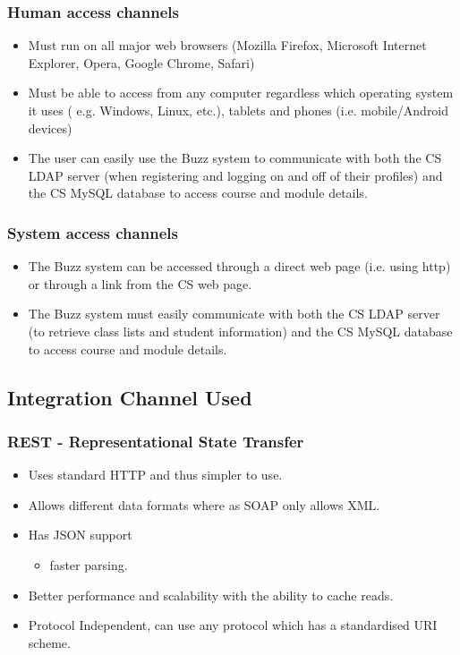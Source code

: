 \documentclass[12pt, oneside]{article}
\begin{document}
	\subsubsection{Human access channels}
		\begin{itemize}
			\item Must run on all major web browsers (Mozilla Firefox, Microsoft Internet Explorer, Opera, Google Chrome, Safari)
			\item Must be able to access from any computer regardless which operating system it uses ( e.g. Windows, Linux, etc.), tablets and phones (i.e. mobile/Android devices)
			\item The user can easily use the Buzz system to communicate with both the CS LDAP server (when registering and logging on and off of their profiles) and the CS MySQL database to access course and module details.
		\end{itemize}
		\subsubsection{System access channels}
			\begin{itemize}
				\item The Buzz system can be accessed through a direct web page (i.e. using http) or through a link from the CS web page.
				\item The Buzz system must easily communicate with both the CS LDAP server (to retrieve class lists and student information) and the CS MySQL database to access course and module details.
			\end{itemize}
	\subsection{Integration Channel Used}
		\subsubsection{REST - Representational State Transfer}
		\begin{itemize}
			\item Uses standard HTTP and thus simpler to use.
		 	\item Allows different data formats where as SOAP only allows XML.
			\item Has JSON support
				\begin{itemize}
					\item faster parsing.				
				\end{itemize}			 
			\item Better performance and scalability with the ability to cache reads.
			\item Protocol Independent, can use any protocol which has a standardised URI scheme.		
		\end{itemize}
\end{document}
